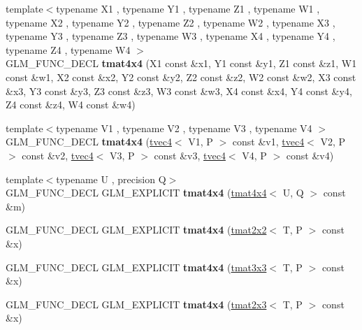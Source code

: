 \begin{DoxyCompactItemize}
{\footnotesize template$<$typename X1 , typename Y1 , typename Z1 , typename W1 , typename X2 , typename Y2 , typename Z2 , typename W2 , typename X3 , typename Y3 , typename Z3 , typename W3 , typename X4 , typename Y4 , typename Z4 , typename W4 $>$ }\\G\+L\+M\+\_\+\+F\+U\+N\+C\+\_\+\+D\+E\+CL {\bfseries tmat4x4} (X1 const \&x1, Y1 const \&y1, Z1 const \&z1, W1 const \&w1, X2 const \&x2, Y2 const \&y2, Z2 const \&z2, W2 const \&w2, X3 const \&x3, Y3 const \&y3, Z3 const \&z3, W3 const \&w3, X4 const \&x4, Y4 const \&y4, Z4 const \&z4, W4 const \&w4)
\item 
\mbox{\label{structglm_1_1tmat4x4_a2e88247f4e213492fc372edce3c226a2}} 
{\footnotesize template$<$typename V1 , typename V2 , typename V3 , typename V4 $>$ }\\G\+L\+M\+\_\+\+F\+U\+N\+C\+\_\+\+D\+E\+CL {\bfseries tmat4x4} (\hyperlink{structglm_1_1tvec4}{tvec4}$<$ V1, P $>$ const \&v1, \hyperlink{structglm_1_1tvec4}{tvec4}$<$ V2, P $>$ const \&v2, \hyperlink{structglm_1_1tvec4}{tvec4}$<$ V3, P $>$ const \&v3, \hyperlink{structglm_1_1tvec4}{tvec4}$<$ V4, P $>$ const \&v4)
\item 
\mbox{\label{structglm_1_1tmat4x4_ab23da6e5a57ab5834de4be100480b406}} 
{\footnotesize template$<$typename U , precision Q$>$ }\\G\+L\+M\+\_\+\+F\+U\+N\+C\+\_\+\+D\+E\+CL G\+L\+M\+\_\+\+E\+X\+P\+L\+I\+C\+IT {\bfseries tmat4x4} (\hyperlink{structglm_1_1tmat4x4}{tmat4x4}$<$ U, Q $>$ const \&m)
\item 
\mbox{\label{structglm_1_1tmat4x4_ab8f61071f4bcaadf761d930e31ae2bbc}} 
G\+L\+M\+\_\+\+F\+U\+N\+C\+\_\+\+D\+E\+CL G\+L\+M\+\_\+\+E\+X\+P\+L\+I\+C\+IT {\bfseries tmat4x4} (\hyperlink{structglm_1_1tmat2x2}{tmat2x2}$<$ T, P $>$ const \&x)
\item 
\mbox{\label{structglm_1_1tmat4x4_a067e574eda5790e829f471ef564b3580}} 
G\+L\+M\+\_\+\+F\+U\+N\+C\+\_\+\+D\+E\+CL G\+L\+M\+\_\+\+E\+X\+P\+L\+I\+C\+IT {\bfseries tmat4x4} (\hyperlink{structglm_1_1tmat3x3}{tmat3x3}$<$ T, P $>$ const \&x)
\item 
\mbox{\label{structglm_1_1tmat4x4_a966a90852a10e3214df58a8823260cb1}} 
G\+L\+M\+\_\+\+F\+U\+N\+C\+\_\+\+D\+E\+CL G\+L\+M\+\_\+\+E\+X\+P\+L\+I\+C\+IT {\bfseries tmat4x4} (\hyperlink{structglm_1_1tmat2x3}{tmat2x3}$<$ T, P $>$ const \&x)

\end{DoxyCompactItemize}
